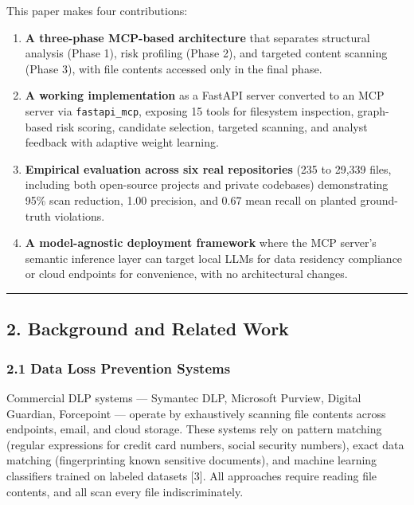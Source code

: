 \documentclass[
]{article}
\begin{document}
This paper makes four contributions:

\begin{enumerate}
\def\labelenumi{\arabic{enumi}.}
\item
  \textbf{A three-phase MCP-based architecture} that separates
  structural analysis (Phase 1), risk profiling (Phase 2), and targeted
  content scanning (Phase 3), with file contents accessed only in the
  final phase.
\item
  \textbf{A working implementation} as a FastAPI server converted to an
  MCP server via \texttt{fastapi\_mcp}, exposing 15 tools for filesystem
  inspection, graph-based risk scoring, candidate selection, targeted
  scanning, and analyst feedback with adaptive weight learning.
\item
  \textbf{Empirical evaluation across six real repositories} (235 to
  29,339 files, including both open-source projects and private
  codebases) demonstrating 95\% scan reduction, 1.00 precision, and 0.67
  mean recall on planted ground-truth violations.
\item
  \textbf{A model-agnostic deployment framework} where the MCP server's
  semantic inference layer can target local LLMs for data residency
  compliance or cloud endpoints for convenience, with no architectural
  changes.
\end{enumerate}

\begin{center}\rule{0.5\linewidth}{0.5pt}\end{center}

\subsection{2. Background and Related
Work}\label{background-and-related-work}

\subsubsection{2.1 Data Loss Prevention
Systems}\label{data-loss-prevention-systems}

Commercial DLP systems --- Symantec DLP, Microsoft Purview, Digital
Guardian, Forcepoint --- operate by exhaustively scanning file contents
across endpoints, email, and cloud storage. These systems rely on
pattern matching (regular expressions for credit card numbers, social
security numbers), exact data matching (fingerprinting known sensitive
documents), and machine learning classifiers trained on labeled datasets
{[}3{]}. All approaches require reading file contents, and all scan
every file indiscriminately.
\end{document}
